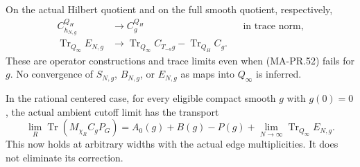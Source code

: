 On the actual Hilbert quotient and on the full smooth
quotient, respectively,
\[
 \begin{aligned}
 C_{h_{N,g}}^{Q_H}&\longrightarrow C_g^{Q_H}
                                      &&\text{in trace norm},\\
 \operatorname{Tr}_{Q_\infty}E_{N,g}
       &\longrightarrow
        \operatorname{Tr}_{Q_\infty}C_{T_{-a}g}
                          -\operatorname{Tr}_{Q_H}C_g .
 \end{aligned}
 \tag{MA-PR.61}
\]
These are operator constructions and trace limits even
when (MA-PR.52) fails for \(g\).
No convergence of \(S_{N,g}\), \(B_{N,g}\), or \(E_{N,g}\)
as maps into \(Q_\infty\) is inferred.

In the rational centered case, for every eligible
compact smooth \(g\) with \(g(0)=0\), the actual
ambient cutoff limit has the transport
\[
 \lim_R\operatorname{Tr}(M_{\chi_R}C_gP_G)
       =A_0(g)+B(g)-P(g)
                       +\lim_{N\to\infty}
                              \operatorname{Tr}_{Q_\infty}E_{N,g}.
 \tag{MA-PR.62}
\]
This now holds at arbitrary widths with the actual
edge multiplicities.  It does not eliminate its correction.

